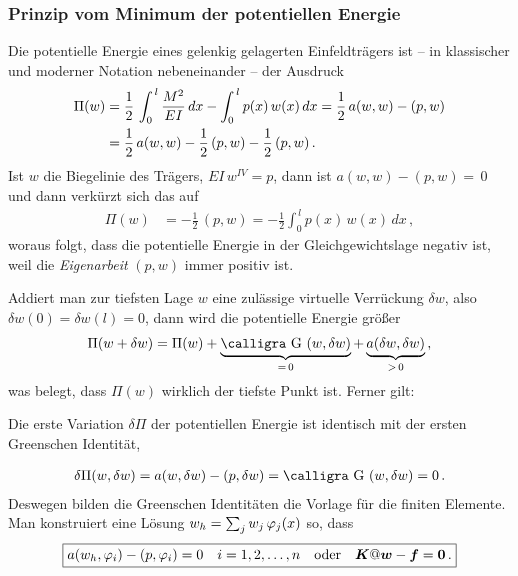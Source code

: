 {{{{{\textcolor{sectionTitleBlue}{\subsubsection*{Prinzip vom Minimum der potentiellen Energie}}}
Die potentielle Energie eines gelenkig gelagerten Einfeldtr\"{a}gers ist -- in klassischer und moderner Notation nebeneinander -- der Ausdruck
\begin{align}
\Pi(w) &=\frac{1}{2}\, \int_0^{\,l} \frac{M^2}{EI}\,dx - \int_0^{\,l} p(x)\,w(x)\,dx = \frac{1}{2}\, a(w,w) - (p,w)\nonumber\\
 &=  \frac{1}{2}\, a(w,w) - \frac{1}{2}\,(p,w) - \frac{1}{2}\,(p,w)\,.
\end{align}
Ist $w$ die Biegelinie des Tr\"{a}gers, $EI\,w^{IV} = p$, dann ist $a(w,w) - (p,w) = \,0$  und dann verk\"{u}rzt sich das auf
\begin{align}
\Pi(w) &=- \frac{1}{2}\,(p,w) = - \frac{1}{2} \int_0^{\,l} p(x)\,w(x)\,dx\,,
\end{align}
woraus folgt, dass die potentielle Energie in der Gleichgewichtslage negativ ist, weil die {\em Eigenarbeit\/} $(p,w)$ immer positiv ist.

Addiert man zur tiefsten Lage $w$ eine zul\"{a}ssige virtuelle Verr\"{u}ckung $\delta w$, also $\delta w(0) = \delta w(l) = 0$, dann wird die potentielle Energie gr\"{o}{\ss}er
\begin{align}
\Pi(w + \delta w) = \Pi(w) + \underbrace{\text{\normalfont\calligra G\,\,}(w,\delta w)}_{=\, 0} + \underbrace{a(\delta w,\delta w)}_{> \,0}\,,
\end{align}
was belegt, dass $\Pi(w)$ wirklich der tiefste Punkt ist. Ferner gilt:\\

\hspace*{-12pt}\colorbox{highlightBlue}{\parbox{0.98\textwidth}{Die erste Variation $\delta \Pi$ der potentiellen Energie ist identisch mit der ersten Greenschen Identit\"{a}t,}}
\begin{align}
\delta \Pi(w, \delta w) = a(w, \delta w) - (p, \delta w) = \text{\normalfont\calligra G\,\,}(w,\delta w) = 0\,.
\end{align}
Deswegen bilden die Greenschen Identit\"{a}ten die Vorlage f\"{u}r die finiten Elemente. Man konstruiert eine L\"{o}sung $w_h = \sum_j w_j\,\varphi_j(x)$ so, dass
\begin{align}\label{Eq190}
\boxed{ a(w_h, \varphi_i) - (p, \varphi_i)= 0 \quad i = 1,2,\ldots, n \quad \text{oder}\quad \mbox{\boldmath $K$} @\mbox{\boldmath $w$} - \mbox{\boldmath $f$} = \mbox{\boldmath $0$}\,.}
\end{align}

}}}}
